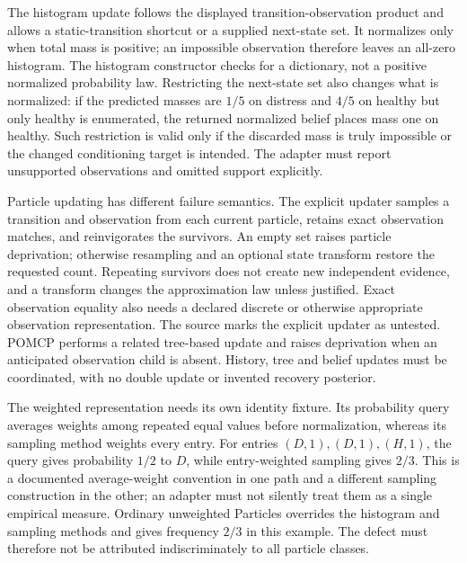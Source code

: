 The histogram update follows the displayed transition-observation product and
allows a static-transition shortcut or a supplied next-state set. It normalizes
only when total mass is positive; an impossible observation therefore leaves
an all-zero histogram. The histogram constructor checks for a dictionary, not
a positive normalized probability law. Restricting the next-state set also
changes what is normalized: if the predicted masses are $1/5$ on distress and
$4/5$ on healthy but only healthy is enumerated, the returned normalized belief
places mass one on healthy. Such restriction is valid only if the discarded
mass is truly impossible or the changed conditioning target is intended.
The adapter must report unsupported observations and omitted support explicitly.
\citep{exec23_pomdppy_sources,exec23_pomdppy_reference}

Particle updating has different failure semantics. The explicit updater samples
a transition and observation from each current particle, retains exact
observation matches, and reinvigorates the survivors. An empty set raises
particle deprivation; otherwise resampling and an optional state transform
restore the requested count. Repeating survivors does not create new
independent evidence, and a transform changes the approximation law unless
justified. Exact observation equality also needs a declared discrete or
otherwise appropriate observation representation. The source marks the explicit
updater as untested. POMCP performs a related tree-based update and raises
deprivation when an anticipated observation child is absent. History, tree and
belief updates must be coordinated, with no double update or invented recovery
posterior. \citep{exec23_pomdppy_sources}

The weighted representation needs its own identity fixture. Its probability
query averages weights among repeated equal values before normalization,
whereas its sampling method weights every entry. For entries $(D,1),(D,1),(H,1)$,
the query gives probability $1/2$ to $D$, while entry-weighted sampling gives
$2/3$. This is a documented average-weight convention in one path and a
different sampling construction in the other; an adapter must not silently
treat them as a single empirical measure. Ordinary unweighted Particles
overrides the histogram and sampling methods and gives frequency $2/3$ in
this example. The defect must therefore not be attributed indiscriminately to
all particle classes. \citep{exec23_pomdppy_sources,exec23_pomdppy_reference}

